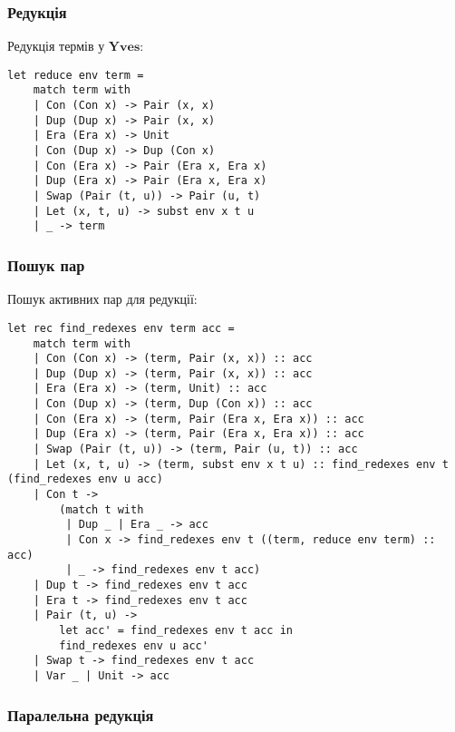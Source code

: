 \documentclass{article}
\begin{document}
\subsubsection{Редукція}

\begin{definition}
Редукція термів у $\mathbf{Yves}$:
\begin{lstlisting}[mathescape=true]
let reduce env term =
    match term with
    | Con (Con x) -> Pair (x, x)
    | Dup (Dup x) -> Pair (x, x)
    | Era (Era x) -> Unit
    | Con (Dup x) -> Dup (Con x)
    | Con (Era x) -> Pair (Era x, Era x)
    | Dup (Era x) -> Pair (Era x, Era x)
    | Swap (Pair (t, u)) -> Pair (u, t)
    | Let (x, t, u) -> subst env x t u
    | _ -> term
\end{lstlisting}
\end{definition}

\subsubsection{Пошук пар}

\begin{definition}
Пошук активних пар для редукції:
\begin{lstlisting}[mathescape=true]
let rec find_redexes env term acc =
    match term with
    | Con (Con x) -> (term, Pair (x, x)) :: acc
    | Dup (Dup x) -> (term, Pair (x, x)) :: acc
    | Era (Era x) -> (term, Unit) :: acc
    | Con (Dup x) -> (term, Dup (Con x)) :: acc
    | Con (Era x) -> (term, Pair (Era x, Era x)) :: acc
    | Dup (Era x) -> (term, Pair (Era x, Era x)) :: acc
    | Swap (Pair (t, u)) -> (term, Pair (u, t)) :: acc
    | Let (x, t, u) -> (term, subst env x t u) :: find_redexes env t (find_redexes env u acc)
    | Con t ->
        (match t with
         | Dup _ | Era _ -> acc
         | Con x -> find_redexes env t ((term, reduce env term) :: acc)
         | _ -> find_redexes env t acc)
    | Dup t -> find_redexes env t acc
    | Era t -> find_redexes env t acc
    | Pair (t, u) ->
        let acc' = find_redexes env t acc in
        find_redexes env u acc'
    | Swap t -> find_redexes env t acc
    | Var _ | Unit -> acc
\end{lstlisting}
\end{definition}

\subsubsection{Паралельна редукція}
\end{document}
